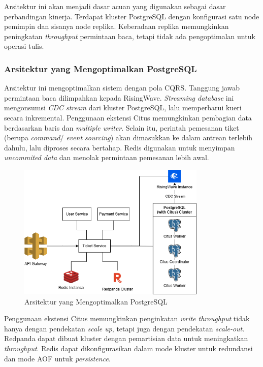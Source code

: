 Arsitektur ini akan menjadi dasar acuan yang digunakan sebagai dasar perbandingan kinerja. Terdapat kluster PostgreSQL dengan konfigurasi satu node pemimpin dan sisanya node replika. Keberadaan replika memungkinkan peningkatan \textit{throughput} permintaan baca, tetapi tidak ada pengoptimalan untuk operasi tulis.

\subsubsection{Arsitektur yang Mengoptimalkan PostgreSQL}

Arsitektur ini mengoptimalkan sistem dengan pola CQRS. Tanggung jawab permintaan baca dilimpahkan kepada RisingWave. \textit{Streaming database} ini mengonsumsi \textit{CDC stream} dari kluster PostgreSQL, lalu memperbarui kueri secara inkremental. Penggunaan ekstensi Citus memungkinkan pembagian data berdasarkan baris dan \textit{multiple writer}. Selain itu, perintah pemesanan tiket (berupa \textit{command}/ \textit{event sourcing}) akan dimasukkan ke dalam antrean terlebih dahulu, lalu diproses secara bertahap. Redis digunakan untuk menyimpan \textit{uncommited data} dan menolak permintaan pemesanan lebih awal.

\begin{figure}[ht]
  \centering
  \includegraphics[width=0.8\textwidth]{resources/chapter-3/architecture-optimized.png}
  \caption{Arsitektur yang Mengoptimalkan PostgreSQL}
  \label{fig:optimized-architecture}
\end{figure}

Penggunaan ekstensi Citus memungkinkan penginkatan \textit{write throughput} tidak hanya dengan pendekatan \textit{scale up}, tetapi juga dengan pendekatan \textit{scale-out}. Redpanda dapat dibuat kluster dengan pemartisian data untuk meningkatkan \textit{throughput}. Redis dapat dikonfigurasikan dalam mode kluster untuk redundansi dan mode AOF untuk \textit{persistence}.

